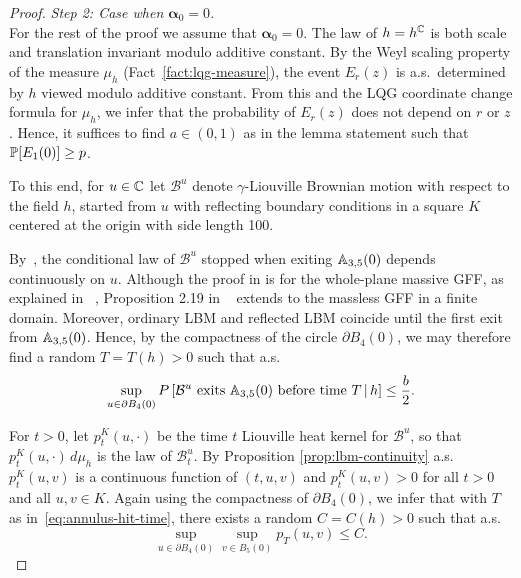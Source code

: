 \documentclass[12pt]{amsart}
\numberwithin{equation}{section}
\begin{document}
\begin{proof}
		
		{\it Step 2: Case when $\boldsymbol{\alpha}_0 = 0$.} \\
		For the rest of the proof we assume that $\boldsymbol{\alpha}_0 = 0$. The law of $h = h^\C$ is both scale and translation invariant modulo additive constant. By the Weyl scaling property of the measure $\mu_h$ (Fact~\ref{fact:lqg-measure}), the event $E_r(z)$ is a.s.\ determined by $h$ viewed modulo additive constant. From this and the LQG coordinate change formula for $\mu_h$, we infer that the probability of $E_r(z)$ does not depend on $r$ or $z$. Hence, it suffices to find $a  \in (0,1)$ as in the lemma statement such that $\P[E_1(0)] \geq p$. 
		
		To this end, for $u \in \C$ let $\mathcal{B}^u$ denote $\gamma$-Liouville Brownian motion with respect to the field $h$, started from $u$ with 
		reflecting boundary conditions in a square $K$ centered at the origin with side length 100. 
		
		By~\cite[Proposition 2.19]{garban2016liouville}, the conditional law of $\mathcal B^u$ stopped when exiting $\A_{3, 5}(0)$ depends continuously on $u$.
		Although the proof in \cite{garban2016liouville} is for the whole-plane massive GFF, as explained in ~\cite[Section 9]{garban2016liouville}, Proposition 2.19 in ~\cite{garban2016liouville} 
		extends to the massless GFF in a finite domain. Moreover, ordinary LBM and reflected LBM coincide until the first exit from $\A_{3,5}(0)$.
		Hence, by the compactness of the circle $\partial B_4(0)$, we may therefore find a random $T = T(h) > 0$ such that a.s.\
		\begin{equation} \label{eq:annulus-hit-time}
		\sup_{u \in \partial B_4(0)}  P\left[ \text{$\mathcal B^u$ exits $\A_{3,5}(0)$ before time $T$} \,|\, h \right] \leq  \frac{b}{2} .
		\end{equation} 
		
		For $t>0$, let $p^K_t(u,\cdot)$ be the time $t$ Liouville heat kernel for $\mathcal B^u$, so that $p^K_t(u,\cdot)\, d\mu_h$ is the law of $\mathcal B^u_t$. 
		By Proposition \ref{prop:lbm-continuity} a.s.\ $p^K_t(u,v)$ is a continuous function of $(t,u,v)$ and  $p^K_t(u,v) > 0$ for all $t > 0$ and all $u,v\in K$. 
		Again using the compactness of $\partial B_4(0)$, we infer that with $T$ as in~\eqref{eq:annulus-hit-time}, there exists a random $C = C(h)  > 0 $ such that a.s.\
		\begin{equation}
		\label{eq:heat-kernel-max}
		\sup_{u\in\partial B_4(0)} \sup_{v\in B_5(0)} p_{T}(u,v) \leq C  .
		\end{equation} 
		

\end{proof}
\end{document}
